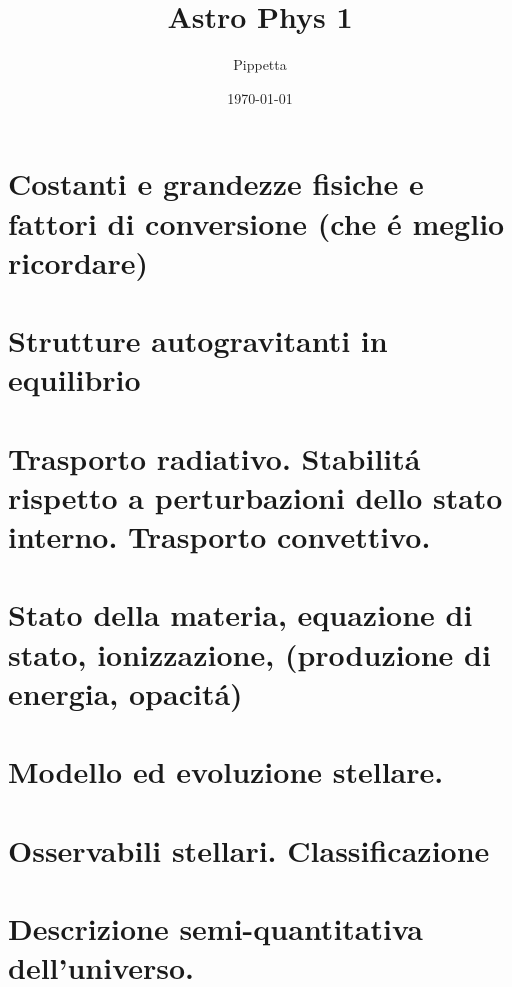 \documentclass[oneside,12pt,fleqn]{memoir}
\author{Pippetta}
\title{Astro Phys 1}
\date{\today}
\begin{document}
\frontmatter
\maketitle
{}
\tableofcontents*

\mainmatter


\part{Costanti e grandezze fisiche e fattori di conversione (che \'e meglio ricordare)}
 



\part{Strutture autogravitanti in equilibrio}



\part{Trasporto radiativo. Stabilit\'a rispetto a perturbazioni dello stato interno. Trasporto convettivo.}




\part{Stato della materia, equazione di stato, ionizzazione, (produzione di energia, opacit\'a)}



\part{Modello ed evoluzione stellare.}



\part{Osservabili stellari. Classificazione}



\part{Descrizione semi-quantitativa dell'universo.}
\end{document}
